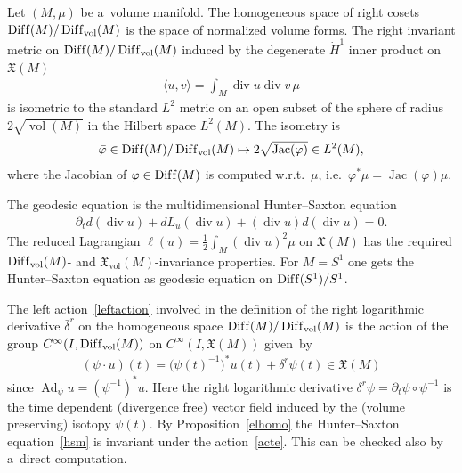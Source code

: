\documentclass[10pt,a4paper]{amsart}
\numberwithin{equation}{section}
\begin{document}
\begin{Example}
\label{ex:HS}
Let $(M,\mu)$ be a~volume manifold.
The homogeneous space of right cosets $\operatorname{Dif\/f}(M)/\operatorname{Dif\/f}_{\operatorname{vol}}(M)$ is the space
of normalized volume forms.
The right invariant metric on $\operatorname{Dif\/f}(M)/\operatorname{Dif\/f}_{\operatorname{vol}}(M)$ induced by the
degenerate $\dot H^1$ inner product on $\mathfrak X(M)$
\begin{gather*}
\langle u,v\rangle=\int_M\operatorname{div} u\operatorname{div} v\, \mu
\end{gather*}
is isometric to the standard $L^2$ metric on an open subset of the sphere of radius $2\sqrt{\operatorname{vol}(M)}$ in
the Hilbert space $L^2(M)$.
The isometry is
\begin{gather*}
\bar\varphi\in\operatorname{Dif\/f}(M)/\operatorname{Dif\/f}_{\operatorname{vol}}(M)\mapsto
2\sqrt{\operatorname{Jac}(\varphi)}\in L^2(M),
\end{gather*}
where the Jacobian of $\varphi\in\operatorname{Dif\/f}(M)$ is computed w.r.t.~$\mu$, i.e.\
$\varphi^*\mu=\operatorname{Jac}(\varphi)\mu$.

The geodesic equation is the {multidimensional Hunter--Saxton} equation
\begin{gather}
\label{hsm}
\partial_t d(\operatorname{div} u)+d L_u (\operatorname{div} u)+(\operatorname{div} u) d(\operatorname{div} u)=0.
\end{gather}
The reduced Lagrangian $ \ell(u)=\frac12\int_M(\operatorname{div} u)^2\mu$ on $\mathfrak X(M)$ has the required
$\operatorname{Dif\/f}_{\operatorname{vol}}(M)$- and $\mathfrak X_{\operatorname{vol}}(M)$-invariance properties.
For $M=S^1$ one gets the Hunter--Saxton equation as geodesic equation on $\operatorname{Dif\/f}(S^1)/S^1$.

The left action~\eqref{leftaction} involved in the def\/inition of the right logarithmic derivative $\bar\delta^r$ on the
ho\-mo\-ge\-neous space $\operatorname{Dif\/f}(M)/\operatorname{Dif\/f}_{\operatorname{vol}}(M)$ is the action of the group
$C^{\infty}(I{,}\operatorname{Dif\/f}_{\operatorname{vol}}(M))$ on $C^{\infty}(I{,}\mathfrak X(M))$ given~by
\begin{gather}
\label{acte}
(\psi\cdot u)(t)=\big(\psi(t)^{-1}\big)^*u(t)+\delta^r\psi(t)\in\mathfrak X(M)
\end{gather}
since $\operatorname{Ad}_\psi u=(\psi^{-1})^*u$.
Here the right logarithmic derivative $\delta^r\psi=\partial_t\psi\circ\psi^{-1}$ is the time dependent (divergence
free) vector f\/ield induced by the (volume preserving) isotopy $\psi(t)$.
By Proposition~\ref{elhomo} the Hunter--Saxton equation~\eqref{hsm} is invariant under the action~\eqref{acte}.
This can be checked also by a~direct computation.
\end{Example}
\end{document}
